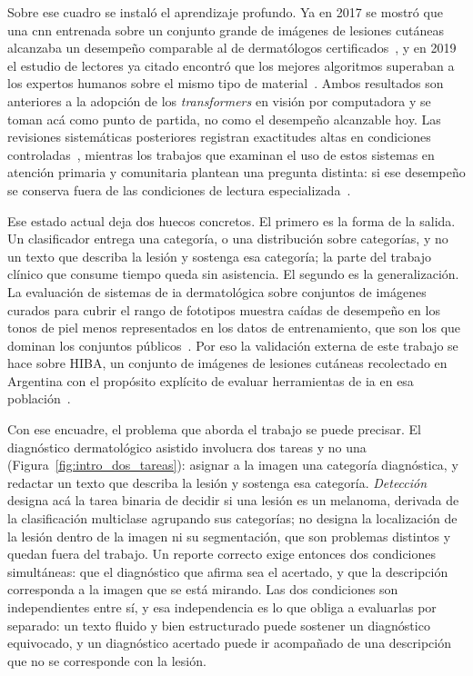 Sobre ese cuadro se instaló el aprendizaje profundo. Ya en 2017 se mostró que una \gls{cnn} entrenada sobre
un conjunto grande de imágenes de lesiones cutáneas alcanzaba un desempeño comparable al de dermatólogos
certificados~\cite{esteva2017dermatologistlevel}, y en 2019 el estudio de lectores ya citado encontró que los
mejores algoritmos superaban a los expertos humanos sobre el mismo tipo de
material~\cite{tschandl2019comparison}. Ambos resultados son anteriores a la adopción de los
\emph{transformers} en visión por computadora y se toman acá como punto de partida, no como el desempeño
alcanzable hoy. Las revisiones sistemáticas posteriores registran exactitudes altas en condiciones
controladas~\cite{magalhaes2024systematic,kreouzi2024learning}, mientras los trabajos que examinan el uso de
estos sistemas en atención primaria y comunitaria plantean una pregunta distinta: si ese desempeño se
conserva fuera de las condiciones de lectura especializada~\cite{jones2022intelligence}.

Ese estado actual deja dos huecos concretos. El primero es la forma de la salida. Un clasificador entrega una
categoría, o una distribución sobre categorías, y no un texto que describa la lesión y sostenga esa
categoría; la parte del trabajo clínico que consume tiempo queda sin asistencia. El segundo es la
generalización. La evaluación de sistemas de \gls{ia} dermatológica sobre conjuntos de imágenes curados para
cubrir el rango de fototipos muestra caídas de desempeño en los tonos de piel menos representados en los
datos de entrenamiento, que son los que dominan los conjuntos
públicos~\cite{daneshjou2022disparities,groh2021neural}. Por eso la validación externa de este trabajo se
hace sobre HIBA, un conjunto de imágenes de lesiones cutáneas recolectado en Argentina con el propósito
explícito de evaluar herramientas de \gls{ia} en esa población~\cite{riccilara2023dataset}.

Con ese encuadre, el problema que aborda el trabajo se puede precisar. El diagnóstico dermatológico asistido
involucra dos tareas y no una (Figura~\ref{fig:intro_dos_tareas}): asignar a la imagen una categoría
diagnóstica, y redactar un texto que describa la lesión y sostenga esa categoría. \emph{Detección} designa acá la tarea binaria de decidir si una
lesión es un melanoma, derivada de la clasificación multiclase agrupando sus categorías; no designa la
localización de la lesión dentro de la imagen ni su segmentación, que son problemas distintos y quedan fuera
del trabajo. Un reporte correcto exige entonces dos condiciones simultáneas: que el diagnóstico que afirma
sea el acertado, y que la descripción corresponda a la imagen que se está mirando. Las dos condiciones son
independientes entre sí, y esa independencia es lo que obliga a evaluarlas por separado: un texto fluido y
bien estructurado puede sostener un diagnóstico equivocado, y un diagnóstico acertado puede ir acompañado de
una descripción que no se corresponde con la lesión.

